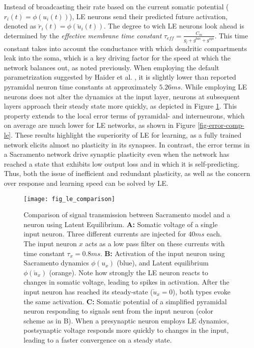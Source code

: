 Instead of broadcasting their rate based on the current somatic potential ($r_i(t) = \phi(u_i(t))$), LE neurons send
their predicted future activation, denoted as $\breve{r}_i(t) = \phi(\breve{u}_i(t))$. The degree to wich LE neurons
look ahead is determined by the \textit{effective membrane time constant} $\tau_{eff} = \frac{C_m}{g_l + g^{bas} +
    g^{api}}$. This time constant takes into account the conductance with which dendritic compartments leak into the soma,
which is a key driving factor for the speed at which the network balances out, as noted previously. When employing the
default parametrization suggested by Haider et al. , it is slightly lower than reported
pyramidal neuron time constants \citep{McCormick1985} at approximately $5.26ms$. While employing LE neurons does not
alter the dynamics at the input layer, neurons at subsequent layers approach their steady state more quickly, as
depicted in Figure \ref{fig-comparison-le}. This property extends to the local error terms of pyramidal- and
interneurons, which on average are much lower for LE networks, as shown in Figure \ref{fig-error-comp-le}. These results
highlight the superiority of LE for learning, as a fully trained network elicits almost no plasticity in its synapses.
In contrast, the error terms in a Sacramento network drive synaptic plasticity even when the network has reached a state
that exhibits low output loss and in which it is self-predicting. Thus, both the issue of inefficient and redundant
plasticity, as well as the concern over response and learning speed can be solved by LE.\newline


\begin{figure}
  \centering
  \texttt{[image: fig\_le\_comparison]}
  \caption{Comparison of signal transmission between Sacramento model and a neuron using Latent Equilibrium. \textbf{A:}
    Somatic voltage of a single input neuron. Three different currents are injected for $40ms$ each. The input neuron
    $x$ acts as a low pass filter on these currents with time constant $\tau_x = 0.8 ms$. \textbf{B:} Activation of the
    input neuron using Sacramento dynamics $\phi(u_x)$ (blue), and Latent equilibrium $\phi(\breve{u}_x)$ (orange). Note
    how strongly the LE neuron reacts to changes in somatic voltage, leading to spikes in activation. After the input
    neuron has reached its steady-state ($\dot{u}_x = 0$), both types evoke the same activation. \textbf{C:} Somatic
    potential of a simplified pyramidal neuron responding to signals sent from the input neuron (color scheme as in B).
    When a presynaptic neuron employs LE dynamics, postsynaptic voltage responds more quickly to changes in the input,
    leading to a faster convergence on a steady state.}
  \label{fig-comparison-le}
\end{figure}


